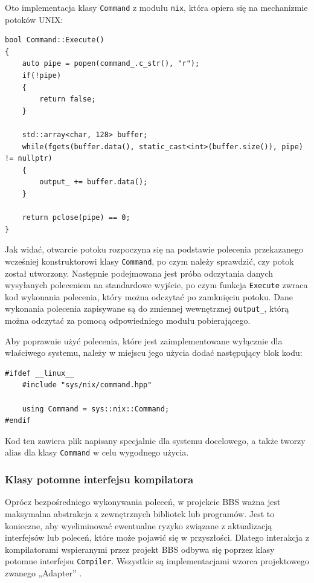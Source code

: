 Oto implementacja klasy \texttt{Command} z modułu \texttt{nix}, która opiera się na mechanizmie potoków UNIX:

\begin{lstlisting}[label=list:command,caption=Metoda Command::Execute(),basicstyle=\footnotesize\ttfamily]
bool Command::Execute()
{
	auto pipe = popen(command_.c_str(), "r");
	if(!pipe)
	{
		return false;
	}

	std::array<char, 128> buffer;
	while(fgets(buffer.data(), static_cast<int>(buffer.size()), pipe) != nullptr)
	{
		output_ += buffer.data();
	}

	return pclose(pipe) == 0;
}
\end{lstlisting}

Jak widać, otwarcie potoku rozpoczyna się na podstawie polecenia przekazanego wcześniej konstruktorowi klasy \texttt{Command}, po czym należy sprawdzić, czy potok został utworzony. Następnie podejmowana jest próba odczytania danych wysyłanych poleceniem na standardowe wyjście, po czym funkcja \texttt{Execute} zwraca kod wykonania polecenia, który można odczytać po zamknięciu potoku. Dane wykonania polecenia zapisywane są do zmiennej wewnętrznej \texttt{output\_}, którą można odczytać za pomocą odpowiedniego modułu pobierającego.

Aby poprawnie użyć polecenia, które jest zaimplementowane wyłącznie dla właściwego systemu, należy w miejscu jego użycia dodać następujący blok kodu:

\begin{lstlisting}[label=list:include_command,caption=Podłączenie prawidłowej klasy Command,basicstyle=\footnotesize\ttfamily]
#ifdef __linux__
    #include "sys/nix/command.hpp"

    using Command = sys::nix::Command;
#endif
\end{lstlisting}

Kod ten zawiera plik napisany specjalnie dla systemu docelowego, a także tworzy alias dla klasy \texttt{Command} w celu wygodnego użycia.

\subsubsection{Klasy potomne interfejsu kompilatora}

Oprócz bezpośredniego wykonywania poleceń, w projekcie BBS ważna jest maksymalna abstrakcja z zewnętrznych bibliotek lub programów. Jest to konieczne, aby wyeliminować ewentualne ryzyko związane z aktualizacją interfejsów lub poleceń, które może pojawić się w przyszłości. Dlatego interakcja z kompilatorami wspieranymi przez projekt BBS odbywa się poprzez klasy potomne interfejsu \texttt{Compiler}. Wszystkie są implementacjami wzorca projektowego zwanego „Adapter” \cite{adapter}.

